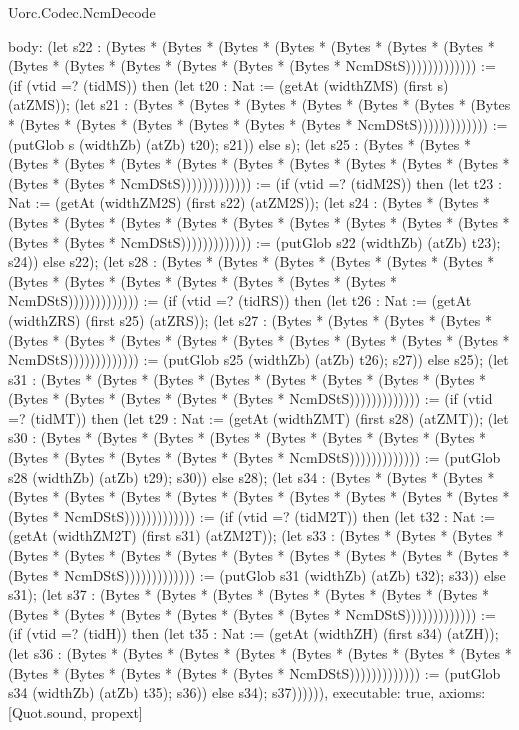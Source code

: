 \begin{lexlean}{Uorc.Codec.NcmDecode}
\begin{semanticmodule}
{  body: (let s22 : (Bytes * (Bytes * (Bytes * (Bytes * (Bytes * (Bytes * (Bytes * (Bytes * (Bytes * (Bytes * (Bytes * (Bytes * (Bytes * NcmDStS))))))))))))) := (if (vtid =? (tidMS)) then (let t20 : Nat := (getAt (widthZMS) (first s) (atZMS)); (let s21 : (Bytes * (Bytes * (Bytes * (Bytes * (Bytes * (Bytes * (Bytes * (Bytes * (Bytes * (Bytes * (Bytes * (Bytes * (Bytes * NcmDStS))))))))))))) := (putGlob s (widthZb) (atZb) t20); s21)) else s); (let s25 : (Bytes * (Bytes * (Bytes * (Bytes * (Bytes * (Bytes * (Bytes * (Bytes * (Bytes * (Bytes * (Bytes * (Bytes * (Bytes * NcmDStS))))))))))))) := (if (vtid =? (tidM2S)) then (let t23 : Nat := (getAt (widthZM2S) (first s22) (atZM2S)); (let s24 : (Bytes * (Bytes * (Bytes * (Bytes * (Bytes * (Bytes * (Bytes * (Bytes * (Bytes * (Bytes * (Bytes * (Bytes * (Bytes * NcmDStS))))))))))))) := (putGlob s22 (widthZb) (atZb) t23); s24)) else s22); (let s28 : (Bytes * (Bytes * (Bytes * (Bytes * (Bytes * (Bytes * (Bytes * (Bytes * (Bytes * (Bytes * (Bytes * (Bytes * (Bytes * NcmDStS))))))))))))) := (if (vtid =? (tidRS)) then (let t26 : Nat := (getAt (widthZRS) (first s25) (atZRS)); (let s27 : (Bytes * (Bytes * (Bytes * (Bytes * (Bytes * (Bytes * (Bytes * (Bytes * (Bytes * (Bytes * (Bytes * (Bytes * (Bytes * NcmDStS))))))))))))) := (putGlob s25 (widthZb) (atZb) t26); s27)) else s25); (let s31 : (Bytes * (Bytes * (Bytes * (Bytes * (Bytes * (Bytes * (Bytes * (Bytes * (Bytes * (Bytes * (Bytes * (Bytes * (Bytes * NcmDStS))))))))))))) := (if (vtid =? (tidMT)) then (let t29 : Nat := (getAt (widthZMT) (first s28) (atZMT)); (let s30 : (Bytes * (Bytes * (Bytes * (Bytes * (Bytes * (Bytes * (Bytes * (Bytes * (Bytes * (Bytes * (Bytes * (Bytes * (Bytes * NcmDStS))))))))))))) := (putGlob s28 (widthZb) (atZb) t29); s30)) else s28); (let s34 : (Bytes * (Bytes * (Bytes * (Bytes * (Bytes * (Bytes * (Bytes * (Bytes * (Bytes * (Bytes * (Bytes * (Bytes * (Bytes * NcmDStS))))))))))))) := (if (vtid =? (tidM2T)) then (let t32 : Nat := (getAt (widthZM2T) (first s31) (atZM2T)); (let s33 : (Bytes * (Bytes * (Bytes * (Bytes * (Bytes * (Bytes * (Bytes * (Bytes * (Bytes * (Bytes * (Bytes * (Bytes * (Bytes * NcmDStS))))))))))))) := (putGlob s31 (widthZb) (atZb) t32); s33)) else s31); (let s37 : (Bytes * (Bytes * (Bytes * (Bytes * (Bytes * (Bytes * (Bytes * (Bytes * (Bytes * (Bytes * (Bytes * (Bytes * (Bytes * NcmDStS))))))))))))) := (if (vtid =? (tidH)) then (let t35 : Nat := (getAt (widthZH) (first s34) (atZH)); (let s36 : (Bytes * (Bytes * (Bytes * (Bytes * (Bytes * (Bytes * (Bytes * (Bytes * (Bytes * (Bytes * (Bytes * (Bytes * (Bytes * NcmDStS))))))))))))) := (putGlob s34 (widthZb) (atZb) t35); s36)) else s34); s37)))))),
  executable: true,
  axioms: [Quot.sound, propext]
}


\end{semanticmodule}
\end{lexlean}
